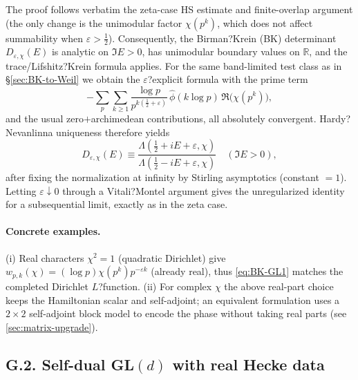 ﻿\documentclass[12pt,a4paper]{article}
\theoremstyle{definition}
\theoremstyle{remark}
\begin{document}
The proof follows verbatim the zeta-case HS estimate and finite-overlap argument (the only change is the unimodular factor $\chi(p^k)$, which does not affect summability when $\varepsilon>\tfrac12$). Consequently, the Birman?Krein (BK) determinant $D_{\varepsilon,\chi}(E)$ is analytic on {$\Im E>0$}, has unimodular boundary values on $\mathbb R$, and the trace/Lifshitz?Krein formula applies. For the same band-limited test class as in 
\S\ref{sec:BK-to-Weil} we obtain the $\varepsilon$?explicit formula with the prime term
\begin{equation*}
-\sum_{p}\sum_{k\ge1}\frac{\log p}{p^{k(\frac12+\varepsilon)}}\,\widehat{\phi}(k\log p)\,\Re\big(\chi(p^k)\big),
\end{equation*}
and the usual zero$+$archimedean contributions, all absolutely convergent. 
Hardy?Nevanlinna uniqueness therefore yields
\begin{equation}
\label{eq:BK-GL1}
D_{\varepsilon,\chi}(E)
\equiv
\frac{\Lambda(\tfrac12+iE+\varepsilon,\chi)}{\Lambda(\tfrac12-iE+\varepsilon,\chi)}\quad(\Im E>0),
\end{equation}
after fixing the normalization at infinity by Stirling asymptotics (constant $=1$). 
Letting $\varepsilon\downarrow0$ through a Vitali?Montel argument gives the unregularized identity for a subsequential limit, exactly as in the zeta case.

\paragraph{Concrete examples.} (i) Real characters $\chi^2=1$ (quadratic Dirichlet) give $w_{p,k}(\chi)=(\log p)\chi(p^k)p^{-\varepsilon k}$ (already real), thus 
\ref{eq:BK-GL1} matches the completed Dirichlet $L$?function.
(ii) For complex $\chi$ the above real-part choice keeps the Hamiltonian scalar and self-adjoint; an equivalent formulation uses a $2\times2$ self-adjoint block model to encode the phase without taking real parts (see 
\ref{sec:matrix-upgrade}).

\subsection{G.2. Self-dual GL$(d)$ with real Hecke data}
\end{document}
